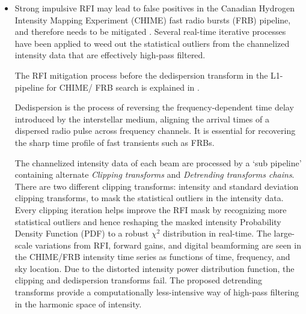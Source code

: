 \begin{itemize}
\item Strong impulsive RFI may lead to false positives in the Canadian Hydrogen Intensity Mapping Experiment (CHIME) fast radio bursts (FRB) pipeline, and therefore needs to be mitigated \citep{chime_frb_rfi_2023}. Several real-time iterative processes have been applied to weed out the statistical outliers from the channelized intensity data that are effectively high-pass filtered.

The RFI mitigation process before the dedispersion transform in the L1-pipeline for CHIME/ FRB search is explained in \citep{chime_frb_rfi_2023}.

Dedispersion is the process of reversing the frequency-dependent time delay introduced by the interstellar medium, aligning the arrival times of a dispersed radio pulse across frequency channels. It is essential for recovering the sharp time profile of fast transients such as FRBs.

The channelized intensity data of each beam are processed by a `sub pipeline' containing alternate \textit{Clipping transforms} and \textit{Detrending transforms chains}. There are two different clipping transforms: intensity and standard deviation clipping transforms, to mask the statistical outliers in the intensity data. Every clipping iteration helps
improve the RFI mask by recognizing more statistical outliers and hence reshaping the masked intensity Probability Density Function (PDF) to a robust $\chi^2$ distribution in real-time. The large-scale variations from RFI, forward gains, and digital beamforming are seen in the CHIME/FRB intensity time series as functions of time, frequency, and sky location. Due to the distorted intensity power distribution function, the clipping and dedispersion transforms fail. The proposed detrending transforms provide a computationally less-intensive way of high-pass filtering in the harmonic space of intensity.


\end{itemize}
